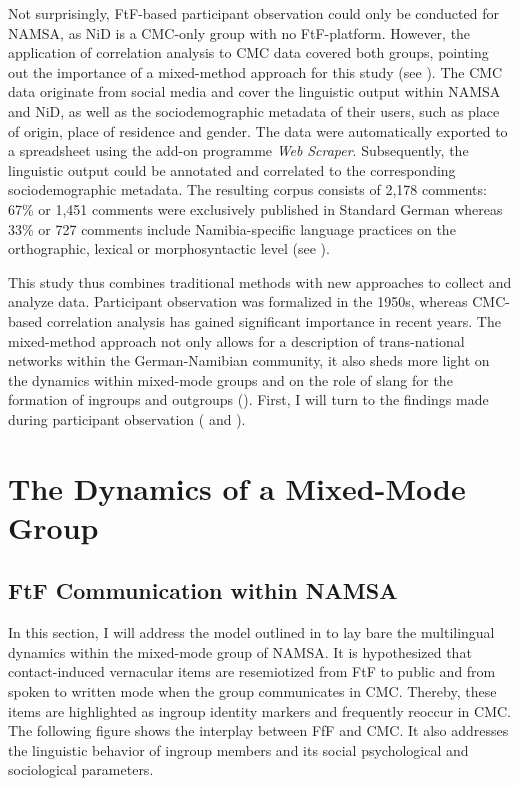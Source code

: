 \documentclass[output=paper]{langsci/langscibook}
\begin{document}
Not surprisingly, FtF-based participant observation could only be conducted for NAMSA, as NiD is a CMC-only group with no FtF-platform. However, the application of correlation analysis to CMC data covered both groups, pointing out the importance of a mixed-method approach for this study (see ). The CMC data originate from social media and cover the linguistic output within NAMSA and NiD, as well as the sociodemographic metadata of their users, such as place of origin, place of residence and gender. The data were automatically exported to a spreadsheet using the add-on programme \textit{Web} \textit{Scraper}. Subsequently, the linguistic output could be annotated and correlated to the corresponding sociodemographic metadata. The resulting corpus consists of 2,178 comments: 67\% or 1,451 comments were exclusively published in Standard German whereas 33\% or 727 comments include Namibia-specific language practices on the orthographic, lexical or morphosyntactic level (see \citealt{radke_urban_inpress}).

This study thus combines traditional methods with new approaches to collect and analyze data. Participant observation was formalized in the 1950s, whereas CMC-based correlation analysis has gained significant importance in recent years. The mixed-method approach not only allows for a description of trans-national networks within the German-Namibian community, it also sheds more light on the dynamics within mixed-mode groups and on the role of slang for the formation of ingroups and outgroups (). First, I will turn to the findings made during participant observation ( and ). 

 
 \section{The Dynamics of a Mixed-Mode Group} 
 \label{sec:radke:3}

 
\subsection{FtF Communication within NAMSA}
 \label{sec:radke:3.1}
 

In this section, I will address the model outlined in  to lay bare the multilingual dynamics within the mixed-mode group of NAMSA. It is hypothesized that contact-induced vernacular items are resemiotized from FtF to public and from spoken to written mode when the group communicates in CMC. Thereby, these items are highlighted as ingroup identity markers and frequently reoccur in CMC. The following figure shows the interplay between FfF and CMC. It also addresses the linguistic behavior of ingroup members and its social psychological and sociological parameters. 
\end{document}
